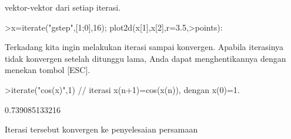 \documentclass[12pt,arial,letterpaper]{book}
\begin{document}
\begin{eulercomment}
\begin{eulercomment}
\begin{eulercomment}
\begin{eulercomment}
\begin{eulercomment}
\begin{eulercomment}
\begin{eulercomment}
\begin{eulercomment}
\begin{eulercomment}
\begin{eulercomment}
\begin{eulercomment}
\begin{eulercomment}
\begin{eulercomment}
\begin{eulercomment}
\begin{eulercomment}
\begin{eulercomment}
\begin{eulercomment}
\begin{eulercomment}
\begin{eulercomment}
\begin{eulercomment}
\begin{eulercomment}
\begin{eulercomment}
\begin{eulercomment}
vektor-vektor dari setiap iterasi.
\end{eulercomment}
\begin{eulerprompt}
>x=iterate("gstep",[1;0],16); plot2d(x[1],x[2],r=3.5,>points):
\end{eulerprompt}
\begin{eulercomment}
\begin{eulercomment}
\begin{eulercomment}
Terkadang kita ingin melakukan iterasi sampai konvergen. Apabila iterasinya tidak konvergen
setelah ditunggu lama, Anda dapat menghentikannya dengan menekan tombol [ESC].
\end{eulercomment}
\begin{eulerprompt}
>iterate("cos(x)",1) // iterasi x(n+1)=cos(x(n)), dengan x(0)=1.
\end{eulerprompt}
\begin{euleroutput}
  0.739085133216
\end{euleroutput}
\begin{eulercomment}
Iterasi tersebut konvergen ke penyelesaian persamaan


\end{eulercomment}
\end{eulercomment}
\end{eulercomment}
\end{eulercomment}
\end{eulercomment}
\end{eulercomment}
\end{eulercomment}
\end{eulercomment}
\end{eulercomment}
\end{eulercomment}
\end{eulercomment}
\end{eulercomment}
\end{eulercomment}
\end{eulercomment}
\end{eulercomment}
\end{eulercomment}
\end{eulercomment}
\end{eulercomment}
\end{eulercomment}
\end{eulercomment}
\end{eulercomment}
\end{eulercomment}
\end{eulercomment}
\end{eulercomment}
\end{eulercomment}
\end{document}
